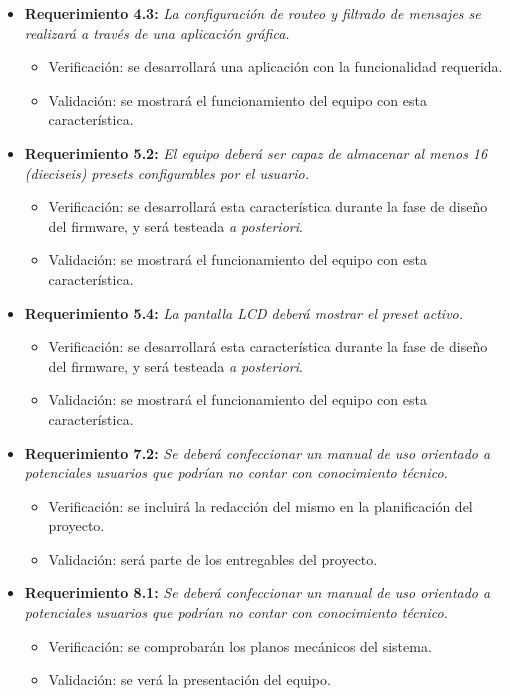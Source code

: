 \documentclass[
11pt, %
]{charter}
\begin{document}
\begin{itemize}
	\item \textbf{Requerimiento 4.3:} \emph{La configuración de \emph{routeo} y filtrado de mensajes se realizará a través de una aplicación gráfica.}
	\begin{itemize}
		\item Verificación: se desarrollará una aplicación con la funcionalidad requerida.
		\item Validación: se mostrará el funcionamiento del equipo con esta característica.  
	\end{itemize}
	
	\item \textbf{Requerimiento 5.2:} \emph{El equipo deberá ser capaz de almacenar al menos 16 (dieciseis) presets configurables por el usuario.}
	\begin{itemize}
		\item Verificación: se desarrollará esta característica durante la fase de diseño del firmware, y será testeada \emph{a posteriori}.
		\item Validación: se mostrará el funcionamiento del equipo con esta característica.
	\end{itemize}

	\item \textbf{Requerimiento 5.4:} \emph{La pantalla LCD deberá mostrar el preset activo.}
	\begin{itemize}
		\item Verificación: se desarrollará esta característica durante la fase de diseño del firmware, y será testeada \emph{a posteriori}.
		\item Validación: se mostrará el funcionamiento del equipo con esta característica.
	\end{itemize}

	\item \textbf{ Requerimiento 7.2:} \emph{Se deberá confeccionar un manual de uso orientado a potenciales usuarios que podrían no contar con conocimiento técnico.}
	\begin{itemize}
		\item Verificación: se incluirá la redacción del mismo en la planificación del proyecto.
		\item Validación: será parte de los entregables del proyecto.
	\end{itemize}
	
	\item \textbf{Requerimiento 8.1:} \emph{Se deberá confeccionar un manual de uso orientado a potenciales usuarios que podrían no contar con conocimiento técnico.}
	\begin{itemize}
		\item Verificación: se comprobarán los planos mecánicos del sistema.
		\item Validación: se verá la presentación del equipo.
	\end{itemize}

\end{itemize}
\end{document}
